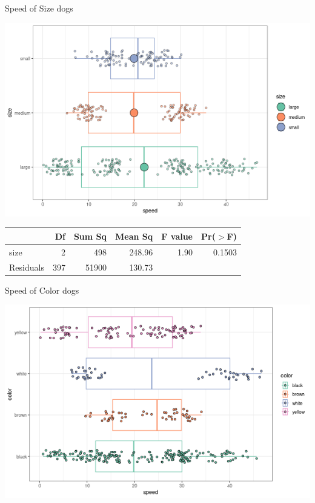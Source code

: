 \documentclass{beamer}
\begin{document}
\begin{frame}{Speed of Size dogs}
\small
\begin{center}
\includegraphics[scale=0.45]{size_dog_speed_mean.png}
\end{center}
\begin{table}[ht]
\centering
\begin{tabular}{lrrrrr}
  \hline
 & Df & Sum Sq & Mean Sq & F value & Pr($>$F) \\ 
  \hline
size        & 2 & 498 & 248.96 & 1.90 & 0.1503 \\ 
  Residuals   & 397 & 51900 & 130.73 &  &  \\ 
   \hline
\end{tabular}
\end{table}
\end{frame}



\begin{frame}{Speed of Color dogs}
\begin{center}
\includegraphics[scale=0.45]{color_dog_speed.png}
\end{center}
\end{frame}
\end{document}
